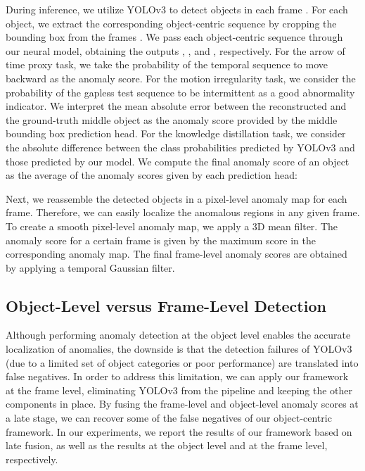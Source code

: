 \documentclass[final]{cvpr}
\begin{document}
During inference, we utilize YOLOv3 to detect objects in each frame . For each object, we extract the corresponding object-centric sequence  by cropping the bounding box from the frames . We pass each object-centric sequence through our neural model, obtaining the outputs , ,  and , respectively. For the arrow of time proxy task, we take the probability of the temporal sequence to move backward as the anomaly score. For the motion irregularity task, we consider the probability of the gapless test sequence  to be intermittent as a good abnormality indicator. We interpret the mean absolute error between the reconstructed and the ground-truth middle object as the anomaly score provided by the middle bounding box prediction head. For the knowledge distillation task, we consider the absolute difference between the class probabilities predicted by YOLOv3 and those predicted by our model. We compute the final anomaly score of an object as the average of the anomaly scores given by each prediction head:

Next, we reassemble the detected objects in a pixel-level anomaly map for each frame. Therefore, we can easily localize the anomalous regions in any given frame. To create a smooth pixel-level anomaly map, we apply a 3D mean filter. The anomaly score for a certain frame is given by the maximum score in the corresponding anomaly map. The final frame-level anomaly scores are obtained by applying a temporal Gaussian filter.

\vspace*{-0.1cm}
\subsection{Object-Level versus Frame-Level Detection}
\vspace*{-0.1cm}

Although performing anomaly detection at the object level enables the accurate localization of anomalies, the downside is that the detection failures of YOLOv3 (due to a limited set of object categories or poor performance) are translated into false negatives. In order to address this limitation, we can apply our framework at the frame level, eliminating YOLOv3 from the pipeline and keeping the other components in place. By fusing the frame-level and object-level anomaly scores at a late stage, we can recover some of the false negatives of our object-centric framework. In our experiments, we report the results of our framework based on late fusion, as well as the results at the object level and at the frame level, respectively.
\end{document}

